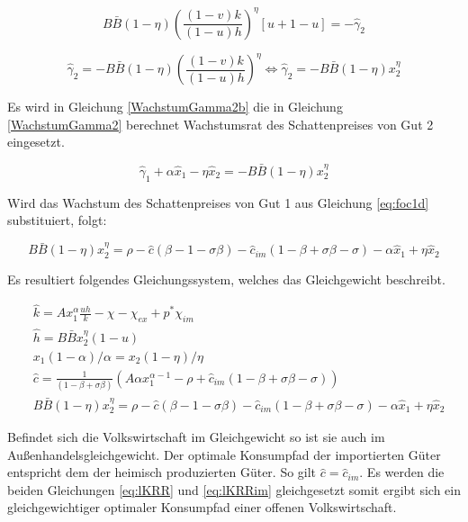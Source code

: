 	\begin{equation*}
		B\bar{B}(1-\eta)\left(\frac{(1-v)k}{(1-u)h}\right)^\eta[u+1-u]=-\hat{\gamma}_2
	\end{equation*}


	\begin{equation}
		\hat{\gamma}_2=-B\bar{B}(1-\eta)\left(\frac{(1-v)k}{(1-u)h}\right)^\eta\Longleftrightarrow \hat{\gamma}_2=-B\bar{B}(1-\eta)x_2^\eta\label{WachstumGamma2b}
	\end{equation}


Es wird in Gleichung \eqref{WachstumGamma2b} die in Gleichung \eqref{WachstumGamma2} berechnet Wachstumsrat des Schattenpreises von Gut 2 eingesetzt.


	\begin{equation}
		\hat{\gamma}_{1}+\alpha\hat{x}_1-\eta\hat{x}_2 =-B\bar{B}(1-\eta)x_2^\eta
	\end{equation} 


Wird das Wachstum des Schattenpreises von Gut 1 aus Gleichung \eqref{eq:foc1d} substituiert, folgt: 


	\begin{equation}
		\boxed{B\bar{B}(1-\eta)x_2^\eta=\rho-\hat{c}(\beta-1-\sigma\beta)-\hat{c}_{im}(1-\beta+\sigma\beta-\sigma)-\alpha\hat{x}_1+\eta\hat{x}_2}
	\end{equation}


Es resultiert folgendes Gleichungssystem, welches das Gleichgewicht beschreibt. 


	\begin{align}
		&\hat{k}=Ax_1^\alpha \frac{uh}{k}-\chi-\chi_{ex}+p^*\chi_{im}\label{GG1}\\
		&\hat{h}=B\bar{B}x_2^\eta(1-u)\label{GG2}\\
		& x_1(1-\alpha)/\alpha =x_2(1-\eta)/\eta\label{GG3}\\
		&\hat{c}=\frac{1}{(1-\beta+\sigma\beta)}\left(A\alpha x_1^{\alpha -1}-\rho+\hat{c}_{im}(1-\beta+\sigma\beta-\sigma)\right)\label{GG4}\\
		&B\bar{B}(1-\eta)x_2^\eta=\rho-\hat{c}(\beta-1-\sigma\beta)-\hat{c}_{im}(1-\beta+\sigma\beta-\sigma)-\alpha\hat{x}_1+\eta\hat{x}_2\label{GG5}
	\end{align}


Befindet sich die Volkswirtschaft im Gleichgewicht so ist sie auch im Au{\ss}enhandelsgleichgewicht. Der optimale Konsumpfad der importierten Güter entspricht dem der heimisch produzierten Güter. So gilt $\hat{c}=\hat{c}_{im}$. Es werden die beiden Gleichungen  \eqref{eq:lKRR} und \eqref{eq:lKRRim} gleichgesetzt somit ergibt sich ein gleichgewichtiger optimaler Konsumpfad einer offenen Volkswirtschaft. 


